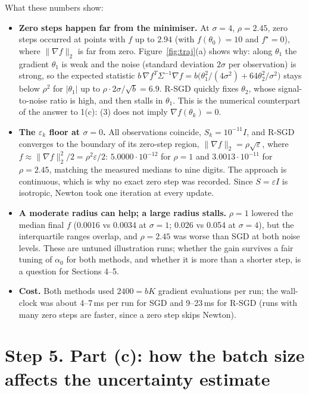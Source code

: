 \documentclass[11pt,a4paper]{article}
\newcommand{\norm}[1]{\lVert #1\rVert_2}
\begin{document}
What these numbers show:
\begin{itemize}
\item \textbf{Zero steps happen far from the minimiser.} At $\sigma=4$, $\rho=2.45$,
zero steps occurred at points with $f$ up to $2.94$ (with $f(\theta_0)=10$ and
$f^\star=0$), where $\norm{\nabla f}$ is far from zero. Figure~\ref{fig:traj}(a) shows
why: along $\theta_1$ the gradient $\theta_1$ is weak and the noise (standard deviation
$2\sigma$ per observation) is strong, so the expected statistic
$b\,\nabla f^T\Sigma^{-1}\nabla f=b\big(\theta_1^2/(4\sigma^2)+64\theta_2^2/\sigma^2\big)$
stays below $\rho^2$ for $|\theta_1|$ up to $\rho\cdot2\sigma/\sqrt b=6.9$. R-SGD quickly
fixes $\theta_2$, whose signal-to-noise ratio is high, and then stalls in $\theta_1$.
This is the numerical counterpart of the answer to 1(c): (3) does not imply
$\nabla f(\theta_k)=0$.
\item \textbf{The $\varepsilon_k$ floor at $\sigma=0$.} All observations coincide,
$S_k=10^{-11}I$, and R-SGD converges to the boundary of its zero-step region,
$\norm{\nabla f}=\rho\sqrt{\varepsilon}$, where $f\approx\norm{\nabla f}^2/2=\rho^2\varepsilon/2$:
$5.0000\cdot10^{-12}$ for $\rho=1$ and $3.0013\cdot10^{-11}$ for $\rho=2.45$, matching
the measured medians to nine digits. The approach is continuous, which is why no exact
zero step was recorded. Since $S=\varepsilon I$ is isotropic, Newton took one iteration
at every update.
\item \textbf{A moderate radius can help; a large radius stalls.} $\rho=1$ lowered the
median final $f$ (0.0016 vs 0.0034 at $\sigma=1$; 0.026 vs 0.054 at $\sigma=4$), but the
interquartile ranges overlap, and $\rho=2.45$ was worse than SGD at both noise levels.
These are untuned illustration runs; whether the gain survives a fair tuning of
$\alpha_0$ for both methods, and whether it is more than a shorter step, is a
question for Sections 4--5.
\item \textbf{Cost.} Both methods used $2400=bK$ gradient evaluations per run; the
wall-clock was about 4--7\,ms per run for SGD and 9--23\,ms for R-SGD (runs with many
zero steps are faster, since a zero step skips Newton).
\end{itemize}

\section*{Step 5. Part (c): how the batch size affects the uncertainty estimate}
\end{document}
